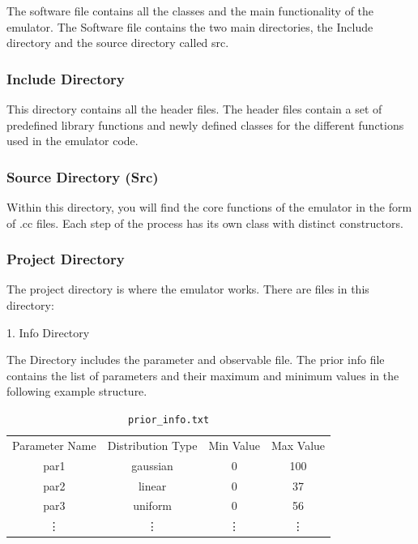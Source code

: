 \documentclass[12pt]{article}
\numberwithin{equation}{section}
\numberwithin{figure}{section}
\begin{document}
The software file contains all the classes and the main functionality of the emulator. The Software file contains the two main directories, the Include directory and the source directory called src.

\subsubsection{Include Directory}

This directory contains all the header files. The header files contain a set of predefined library functions and newly defined classes for the different functions used in the emulator code. 

\subsubsection{Source Directory (Src)}

Within this directory, you will find the core functions of the emulator in the form of .cc files. Each step of the process has its own class with distinct constructors.  

\newpage

\subsubsection{Project Directory}
The project directory is where the emulator works. There are files in this directory: 

1. Info Directory 

The Directory includes the parameter and observable file. 
The prior info file contains the list of parameters and their maximum and minimum values in the following example structure. 

\begin{table}[!h]
    \centering
    \begin{tabular}{c|c|c|c}
         Parameter Name & Distribution Type & Min Value & Max Value \\
         par1 & gaussian & 0 & 100\\
         par2 & linear & 0 & 37 \\
         par3 & uniform & 0 &  56 \\
          \vdots & \vdots & \vdots & \vdots
    \end{tabular}
    \caption{{\tt{prior\_info.txt}}}
    \label{tab:my_label}
\end{table}

 \\ 
 
\end{document}
